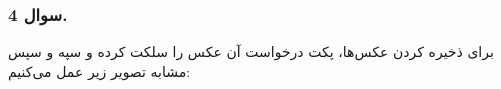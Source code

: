 \subsubsection*{سوال 4.}

برای ذخیره کردن عکس‌ها، پکت درخواست آن عکس را سلکت کرده و سپه و سپس مشابه تصویر زیر عمل می‌کنیم:

{
}